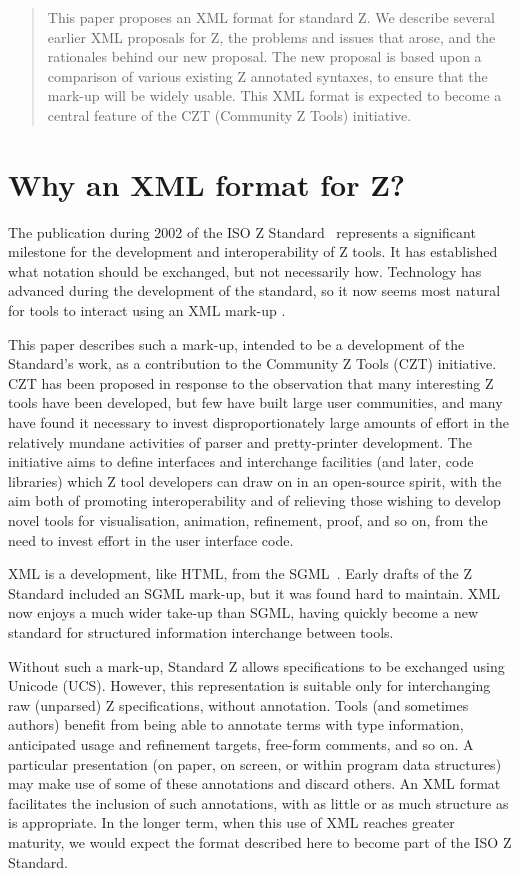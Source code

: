 \documentclass{llncs}  %
\begin{document}
\begin{abstract}
  This paper proposes an XML format for standard Z.
  We describe several earlier XML proposals for Z,
  the problems and issues that arose, and the rationales
  behind our new proposal.
  The new proposal is based upon a comparison of various existing Z
  annotated syntaxes, to ensure that the mark-up will be widely usable.
  This XML format is expected to become a central feature of
  the CZT (Community Z Tools) initiative.
\end{abstract}

\section{Why an XML format for Z?}

The publication during 2002 of the ISO Z Standard~\cite{ISOZ}
represents a significant milestone for the development and
interoperability of Z tools.  It has established what notation should be
exchanged, but not necessarily how.  Technology has advanced during the
development of the standard, so it now seems most natural for tools
to interact using an XML mark-up \cite{XML}.

This paper describes such a mark-up, intended to be a development of the
Standard's work, as a contribution to the Community Z Tools (CZT)
initiative.  CZT has been proposed in response to the observation that
many interesting Z tools have been developed, but few have built large
user communities, and many have found it necessary to invest
disproportionately large amounts of effort in the relatively mundane
activities of parser and pretty-printer development.  The initiative aims
to define interfaces and interchange facilities (and later, code
libraries) which Z tool developers can draw on in an open-source spirit,
with the aim both of promoting interoperability and of relieving those
wishing to develop novel tools for visualisation, animation, refinement,
proof, and so on, from the need to invest effort in the user interface
code.

XML is a development, like HTML, from the SGML~\cite{SGML86}.  Early drafts
of the Z Standard included an SGML mark-up, but it was found hard to
maintain. XML now enjoys a much wider take-up than SGML, having quickly
become a new standard for structured information interchange between tools.

Without such a mark-up, Standard Z allows specifications to be exchanged
using Unicode (UCS\cite{ISO10646-1,ISO10646-2}).
However, this representation is suitable only
for interchanging raw (unparsed) Z specifications, without annotation.
Tools (and sometimes authors) benefit from being able to annotate terms
with type information, anticipated usage and refinement targets, free-form
comments, and so on.   A particular presentation (on paper, on screen, or
within program data structures) may make use of some of these annotations
and discard others.  An XML format facilitates the inclusion of such
annotations, with as little or as much structure as is appropriate.  In
the longer term, when this use of XML reaches greater maturity, we would
expect the format described here to become part of the ISO Z Standard.
\end{document}
